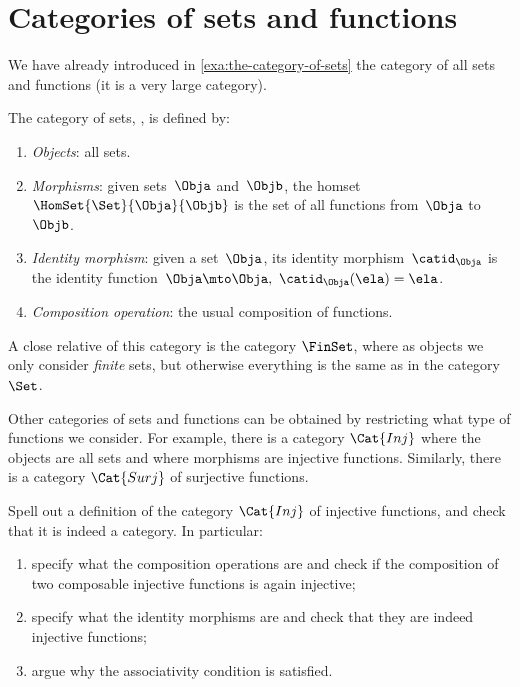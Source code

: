 
\section{Categories of sets and functions}

We have already introduced in \cref{exa:the-category-of-sets} the category of all sets and functions (it is a very large category). 

\begin{ctdefinition}
    \label{def:Set}
    The category of sets, \iindex{\Set}, is defined by:
    \begin{enumerate}
        \item \emph{Objects}: all sets.
        \item \emph{Morphisms}: given sets~$\Obja$ and~$\Objb$, the homset~$\HomSet{\Set}{\Obja}{\Objb}$ is the set of all functions from~$\Obja$ to~$\Objb$.
        \item \emph{Identity morphism}: given a set~$\Obja$, its identity morphism~$\catid_\Obja$ is the identity function~$\Obja \mto \Obja, \ \catid_\Obja(\ela) = \ela$.
        \item \emph{Composition operation}: the usual composition of functions.
    \end{enumerate}
\end{ctdefinition}

A close relative of this category is the category $\FinSet$, where as objects we only consider \emph{finite} sets, but otherwise everything is the same as in the category $\Set$. 

Other categories of sets and functions can be obtained by restricting what type of functions we consider. For example, there is a category $\Cat{Inj}$ where the objects are all sets and where morphisms are injective functions. Similarly, there is a category $\Cat{Surj}$ of surjective functions. 

\begin{exercise}
Spell out a definition of the category $\Cat{Inj}$ of injective functions, and check that it is indeed a category. In particular:
\begin{enumerate}
\item specify what the composition operations are and check if the composition of two composable injective functions is again injective;
\item specify what the identity morphisms are and check that they are indeed injective functions;
\item argue why the associativity condition is satisfied. 
\end{enumerate}
\end{exercise}

